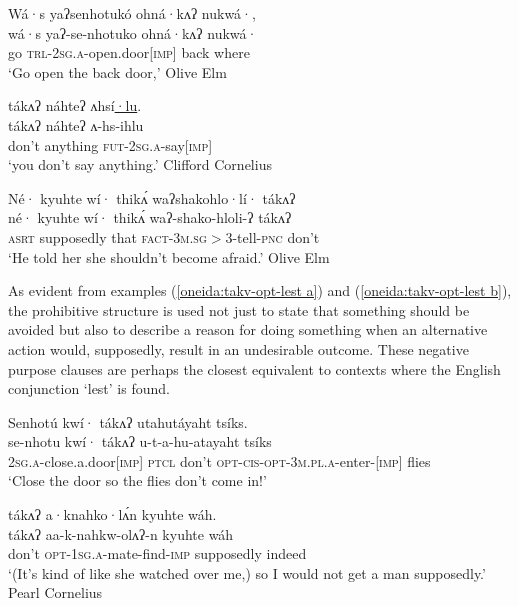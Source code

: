 \documentclass[output=paper,colorlinks,citecolor=brown]{langscibook}
\begin{document}
\ea\label{oneida:imp}
    \glll Wá·s yaʔsenhotuk\'o ohná·kʌʔ nukwá·, \\
    wá·s yaʔ-se-nhotuko	ohná·kʌʔ nukwá· \\
    go \textsc{trl-2sg.a}-open.door[\textsc{imp}] back where \\
    \glt `Go open the back door,' Olive Elm \citep[60 (4)]{MichelsonEtAl2016} 
\z

\ea\label{oneida:takv-fut}
    \glll tákʌʔ náhteʔ ʌhsí\uline{·lu}.\\
    tákʌʔ náhteʔ ʌ-hs-ihlu\\
    don't anything \textsc{fut-2sg.a}-say[\textsc{imp}] \\
    \glt `you don't say anything.' Clifford Cornelius \citep[230 (85)]{MichelsonEtAl2016} 
\z

\ea\label{oneida:takv-opt-prohibit}
    {\glll Né· {kyuhte wí·} thikʌ́ waʔshakohlo·lí· tákʌʔ \\
    né· {kyuhte wí·} thikʌ́ waʔ-shako-hloli-ʔ tákʌʔ \\
    \textsc{asrt} supposedly that \textsc{fact-3m.sg$>$3}-tell-\textsc{pnc}  don't \\} 
    \glt `He told her she shouldn't become afraid.' Olive Elm \citep[169 (47)]{MichelsonEtAl2016}
\z

As evident from examples (\ref{oneida:takv-opt-lest a}) and (\ref{oneida:takv-opt-lest b}), the prohibitive structure is used not just to state that something should be avoided but also to describe a reason for doing something when an alternative action would, supposedly, result in an undesirable outcome. These negative purpose clauses are perhaps the closest equivalent to contexts where the English conjunction `lest' is found.
 
\ea\label{oneida:takv-opt-lest a}
    \glll Senhotú kwí· tákʌʔ utahutáyaht tsíks. \\
    se-nhotu kwí· tákʌʔ u-t-a-hu-atayaht tsíks \\
    \textsc{2sg.a}-close.a.door[\textsc{imp}] \textsc{ptcl} don't \textsc{opt-cis-opt-3m.pl.a}-enter-[\textsc{imp}] flies \\
    \glt `Close the door so the flies don't come in!'  \citep[526]{MichelsonDoxtator2002}
\z

\ea\label{oneida:takv-opt-lest b}
    \glll tákʌʔ a·knahko·lʌ́n kyuhte wáh.\\
    tákʌʔ aa-k-nahkw-olʌʔ-n kyuhte wáh\\
    don't \textsc{opt-1sg.a}-mate-find-\textsc{imp} supposedly indeed \\
    \glt `(It's kind of like she watched over me,) so I would not get a man supposedly.' Pearl Cornelius \citep[310 (130)]{MichelsonEtAl2016}
\z
\end{document}
